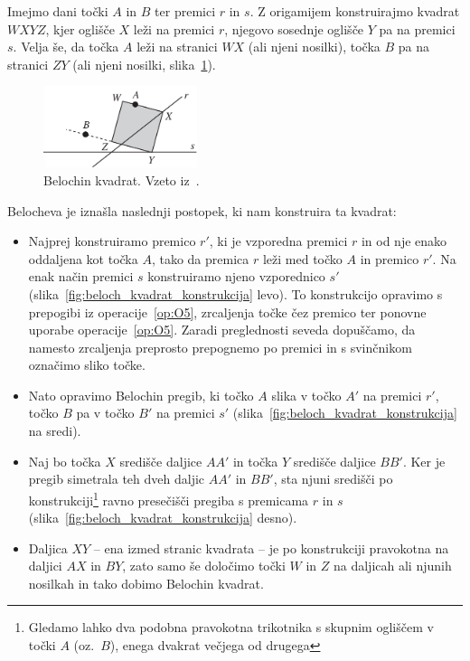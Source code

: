 Imejmo dani točki $A$ in $B$ ter premici $r$ in $s$. Z origamijem konstruirajmo kvadrat $WXYZ$, kjer oglišče $X$ leži na premici $r$, njegovo sosednje oglišče $Y$ pa na premici $s$. Velja še, da točka $A$ leži na stranici $WX$ (ali njeni nosilki), točka $B$ pa na stranici $ZY$ (ali njeni nosilki, slika~\ref{fig:beloch_kvadrat}).

\begin{figure}[h]
    \centering
    \includegraphics[width=0.4\textwidth]{images/kubična enačba/beloch_kvadrat.png}
    \caption[Belochin kvadrat]{Belochin kvadrat. Vzeto iz~\cite[str.\ 309]{hull2011}.}
    \label{fig:beloch_kvadrat}
\end{figure}

Belocheva je iznašla naslednji postopek, ki nam konstruira ta kvadrat:
\begin{itemize}
    \item Najprej konstruiramo premico $r'$, ki je vzporedna premici $r$ in od nje enako oddaljena kot točka $A$, tako da premica $r$ leži med točko $A$ in premico $r'$. Na enak način premici $s$ konstruiramo njeno vzporednico $s'$ (slika~\ref{fig:beloch_kvadrat_konstrukcija} levo). To konstrukcijo opravimo s prepogibi iz operacije~\ref{op:O5}, zrcaljenja točke čez premico ter ponovne uporabe operacije~\ref{op:O5}. Zaradi preglednosti seveda dopuščamo, da namesto zrcaljenja preprosto prepognemo po premici in s svinčnikom označimo sliko točke.
    \item Nato opravimo Belochin pregib, ki točko $A$ slika v točko $A'$ na premici $r'$, točko $B$ pa v točko $B'$ na premici $s'$ (slika~\ref{fig:beloch_kvadrat_konstrukcija} na sredi).
    \item Naj bo točka $X$ središče daljice $AA'$ in točka $Y$ središče daljice $BB'$. Ker je pregib simetrala teh dveh daljic $AA'$ in $BB'$, sta njuni središči po konstrukciji\footnote{Gledamo lahko dva podobna pravokotna trikotnika s skupnim ogliščem v točki $A$ (oz.\ $B$), enega dvakrat večjega od drugega} ravno presečišči pregiba s premicama $r$ in $s$ (slika~\ref{fig:beloch_kvadrat_konstrukcija} desno).
    \item Daljica $XY$ -- ena izmed stranic kvadrata -- je po konstrukciji pravokotna na daljici $AX$ in $BY$, zato samo še določimo točki $W$ in $Z$ na daljicah ali njunih nosilkah in tako dobimo Belochin kvadrat.
\end{itemize}

